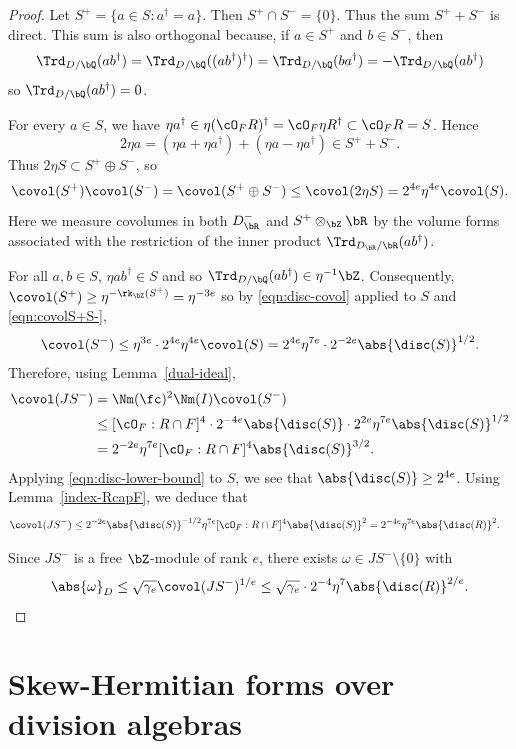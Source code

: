 \begin{proof}
Let $S^+ = \{ a \in S : a^\dag = a \}$.
Then $S^+ \cap S^- = \{0\}$.
Thus the sum $S^+ + S^-$ is direct. This sum is also orthogonal because, if $a \in S^+$ and $b \in S^-$, then
\[
\Trd_{D/\bQ}(ab^\dag) = \Trd_{D/\bQ}((ab^\dag)^\dag) = \Trd_{D/\bQ}(ba^\dag) = -\Trd_{D/\bQ}(ab^\dag)
\]
so $\Trd_{D/\bQ}(ab^\dag) = 0$.

For every $a \in S$, we have $\eta a^\dag \in \eta (\cO_F R)^\dag = \cO_F \eta R^\dag \subset \cO_F R = S$.
Hence
\[
2\eta a = (\eta a+\eta a^\dag) + (\eta a-\eta a^\dag) \in S^+ + S^-.
\]
Thus $2\eta S \subset S^+\oplus S^-$, so
\begin{equation} \label{eqn:covolS+S-}
\covol(S^+) \covol(S^-) = \covol(S^+ \oplus S^-) \leq \covol(2\eta S) = 2^{4e} \eta^{4e} \covol(S).
\end{equation}
Here we measure covolumes in both $D_\bR^-$ and $S^+ \otimes_{\bZ} \bR$ by the volume forms associated with the restriction of the inner product $\Trd_{D_\bR/\bR}(ab^\dag)$.

For all $a,b \in S$, $\eta ab^\dag \in S$ and so $\Trd_{D/\bQ}(ab^\dag) \in \eta^{-1}\bZ$.
Consequently, $\covol(S^+) \geq \eta^{-\rk_\bZ(S^+)} = \eta^{-3e}$ so by \eqref{eqn:disc-covol} applied to $S$ and \eqref{eqn:covolS+S-},
\[
\covol(S^-) \leq \eta^{3e} \cdot 2^{4e} \eta^{4e} \covol(S) = 2^{4e} \eta^{7e} \cdot 2^{-2e} \abs{\disc(S)}^{1/2}.
\]
Therefore, using Lemma~\ref{dual-ideal},
\begin{align*}
\covol(JS^-)
& = \Nm(\fc)^2 \Nm(I) \covol(S^-)
\\& \leq [\cO_F : R \cap F]^4 \cdot 2^{-4e} \abs{\disc(S)} \cdot 2^{2e} \eta^{7e} \abs{\disc(S)}^{1/2}
\\& = 2^{-2e} \eta^{7e} [\cO_F : R \cap F]^4 \abs{\disc(S)}^{3/2}.
\end{align*}
Applying \eqref{eqn:disc-lower-bound} to $S$, we see that $\abs{\disc(S)} \geq 2^{4e}$.
Using Lemma~\ref{index-RcapF}, we deduce that
\begin{align*}
\covol(JS^-)
& \leq 2^{-2e} \abs{\disc(S)}^{-1/2} \eta^{7e} [\cO_F : R \cap F]^4 \abs{\disc(S)}^2
= 2^{-4e} \eta^{7e} \abs{\disc(R)}^2.
\end{align*}

Since $JS^-$ is a free $\bZ$-module of rank $e$, there exists $\omega \in JS^- \setminus \{0\}$ with
\[
\abs{\omega}_D \leq \sqrt{\gamma_e} \covol(JS^-)^{1/e} \leq \sqrt{\gamma_e} \cdot 2^{-4} \eta^7 \abs{\disc(R)}^{2/e}.
\qedhere
\]
\end{proof}

\section{Skew-Hermitian forms over division algebras} \label{sec:skew-hermitian}

